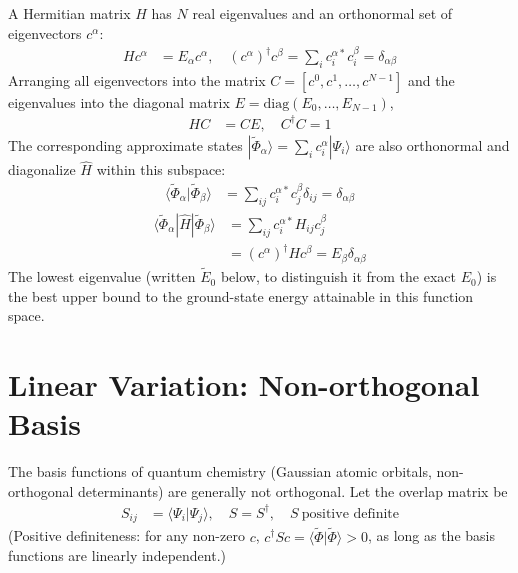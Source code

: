 A Hermitian matrix $H$ has $N$ real eigenvalues and an orthonormal set of eigenvectors $c^{\alpha}$:
\begin{align*}
H c^{\alpha} &= E_{\alpha} c^{\alpha}, \quad (c^{\alpha})^{\dagger} c^{\beta} = \sum_i c_i^{\alpha *} c_i^{\beta} = \delta_{\alpha\beta}
\end{align*}
Arranging all eigenvectors into the matrix $C = [c^{0}, c^{1}, \ldots, c^{N-1}]$ and the eigenvalues into the diagonal matrix $E = \text{diag}(E_0, \ldots, E_{N-1})$,
\begin{align*}
H C & = C E, \quad C^\dagger C = 1
\end{align*}
The corresponding approximate states $|\tilde{\Phi}_\alpha\rangle = \sum_i c_i^\alpha |\Psi_i\rangle$ are also orthonormal and diagonalize $\hat{H}$ within this subspace:
\begin{align*}
\langle\tilde{\Phi}_\alpha|\tilde{\Phi}_\beta\rangle &= \sum_{ij} c_i^{\alpha *} c_j^\beta \delta_{ij} = \delta_{\alpha \beta}
\end{align*}
\begin{align*}
\langle\tilde{\Phi}_\alpha|\hat{H}|\tilde{\Phi}_\beta\rangle &= \sum_{ij} c_i^{\alpha *} H_{ij} c_j^\beta \\
&= (c^\alpha)^\dagger H c^\beta = E_\beta \delta_{\alpha \beta}
\end{align*}
The lowest eigenvalue (written $\tilde{E}_0$ below, to distinguish it from the exact $E_0$) is the best upper bound to the ground-state energy attainable in this function space.

\section{Linear Variation: Non-orthogonal Basis}

The basis functions of quantum chemistry (Gaussian atomic orbitals, non-orthogonal determinants) are generally not orthogonal. Let the overlap matrix be
\begin{align*}
S_{ij} &= \langle \Psi_i|\Psi_j\rangle, \quad S = S^\dagger, \quad S \ \text{positive definite}
\end{align*}
(Positive definiteness: for any non-zero $c$, $c^\dagger S c = \langle \tilde{\Phi}|\tilde{\Phi}\rangle > 0$, as long as the basis functions are linearly independent.)

